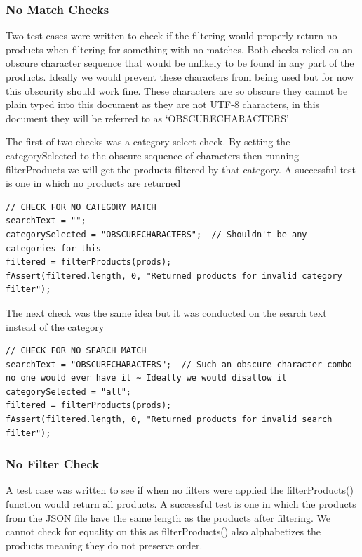 \documentclass{article}[12pt]
\begin{document}
\subsubsection{No Match Checks}
Two test cases were written to check if the filtering would properly return no products when filtering for something with no matches. Both checks relied on an obscure character sequence that would be unlikely to be found in any part of the products. Ideally we would prevent these characters from being used but for now this obscurity should work fine. These characters are so obscure they cannot be plain typed into this document as they are not UTF-8 characters, in this document they will be referred to as `OBSCURECHARACTERS'

The first of two checks was a category select check. By setting the categorySelected to the obscure sequence of characters then running filterProducts we will get the products filtered by that category. A successful test is one in which no products are returned

\begin{lstlisting}
// CHECK FOR NO CATEGORY MATCH
searchText = "";
categorySelected = "OBSCURECHARACTERS";  // Shouldn't be any categories for this
filtered = filterProducts(prods);
fAssert(filtered.length, 0, "Returned products for invalid category filter");
\end{lstlisting}

The next check was the same idea but it was conducted on the search text instead of the category

\begin{lstlisting}
// CHECK FOR NO SEARCH MATCH
searchText = "OBSCURECHARACTERS";  // Such an obscure character combo no one would ever have it ~ Ideally we would disallow it
categorySelected = "all";
filtered = filterProducts(prods);
fAssert(filtered.length, 0, "Returned products for invalid search filter");
\end{lstlisting}

\subsubsection{No Filter Check}
A test case was written to see if when no filters were applied the filterProducts() function would return all products. A successful test is one in which the products from the JSON file have the same length as the products after filtering. We cannot check for equality on this as filterProducts() also alphabetizes the products meaning they do not preserve order.
\end{document}
